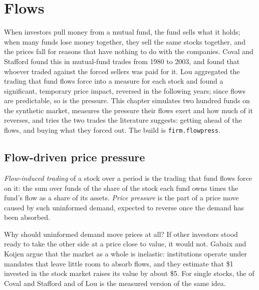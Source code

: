 \chapter{Flows}\label{ch:s1:flows}

When investors pull money from a mutual fund, the fund sells what it holds; when many funds lose money together, they sell the same stocks together, and
the prices fall for reasons that have nothing to do with the companies. Coval and Stafford found this  in mutual-fund trades from 1980 to
2003, and found that whoever traded against the forced sellers was paid for it. Lou aggregated the trading that fund flows force into a measure for each
stock and found a significant, temporary price impact, reversed in the following years; since flows are predictable, so is the pressure. This chapter
simulates two hundred funds on the synthetic market, measures the pressure their flows exert and how much of it reverses, and tries the two trades the
literature suggests: getting ahead of the flows, and buying what they forced out. The build is \texttt{firm.flowpress}.

\section{Flow-driven price pressure}

\begin{definition}\label{def:s1:flows:fit}
\emph{Flow-induced trading} of a stock over a period is the trading that fund flows force on it: the sum over funds of the share of
the stock each fund owns times the fund's flow as a share of its assets. \emph{Price pressure} is the part of a price move caused by
such uninformed demand, expected to reverse once the demand has been absorbed.
\end{definition}

Why should uninformed demand move prices at all? If other investors stood ready to take the other side at a price close to value, it would not. Gabaix and
Koijen argue that the market as a whole is inelastic: institutions operate under mandates that leave little room to absorb flows, and they estimate that
\$1 invested in the stock market raises its value by about \$5. For single stocks, the  of Coval and Stafford and of Lou is the measured
version of the same idea.

